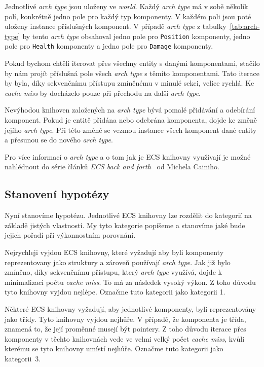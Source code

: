Jednotlivé \textit{arch type} jsou uloženy ve \textit{world}. Každý \textit{arch type} má v sobě několik polí, konkrétně jedno pole pro každý typ komponenty. V každém poli jsou poté uloženy instance příslušných komponent. V případě \textit{arch type} z tabulky~\ref{tab:arch-type} by tento \textit{arch type} obsahoval jedno pole pro \texttt{Position} komponenty, jedno pole pro \texttt{Health} komponenty a jedno pole pro \texttt{Damage} komponenty.

Pokud bychom chtěli iterovat přes všechny entity s danými komponentami, stačilo by nám projít příslušná pole všech \textit{arch type} s těmito komponentami. Tato iterace by byla, díky sekvenčnímu přístupu zmíněnému v minulé sekci, velice rychlá. Ke \textit{cache miss} by docházelo pouze při přechodu na další \textit{arch type}.

Nevýhodou knihoven založených na \textit{arch type} bývá pomalé přidávání a odebírání komponent. Pokud je entitě přidána nebo odebrána komponenta, dojde ke změně jejího \textit{arch type}. Při této změně se vezmou instance všech komponent dané entity a přesunou se do nového \textit{arch type}.

Pro více informací o \textit{arch type} a o tom jak je ECS knihovny využívají je možné nahlédnout do série článků \textit{ECS back and forth}~\cite{Caini_2019} od Michela Cainiho.

\subsection{Stanovení hypotézy}
\label{hypothesis}
Nyní stanovíme hypotézu. Jednotlivé ECS knihovny lze rozdělit do kategorií na základě jistých vlastností. My tyto kategorie popíšeme a stanovíme jaké bude jejich pořadí při výkonnostním porovnání.

Nejrychleji vyjdou ECS knihovny, které vyžadují aby byli komponenty reprezentovany jako struktury a zároveň používají \textit{arch type}. Jak již bylo zmíněno, díky sekvenčnímu přístupu, který \textit{arch type} využívá, dojde k minimalizaci počtu \textit{cache miss}. To má za následek vysoký výkon. Z toho důvodu tyto knihovny vyjdou nejlépe. Označme tuto kategorii jako kategorii 1.

Některé ECS knihovny vyžadují, aby jednotlivé komponenty, byli reprezentovány jako třídy. Tyto knihovny vyjdou nejhůře. V případě, že komponenta je třída, znamená to, že její proměnné musejí být pointery. Z toho důvodu iterace přes komponenty v těchto knihovnách vede ve velmi velký počet \textit{cache miss}, kvůli kterému se tyto knihovny umístí nejhůře. Označme tuto kategorii jako kategorii~3.

